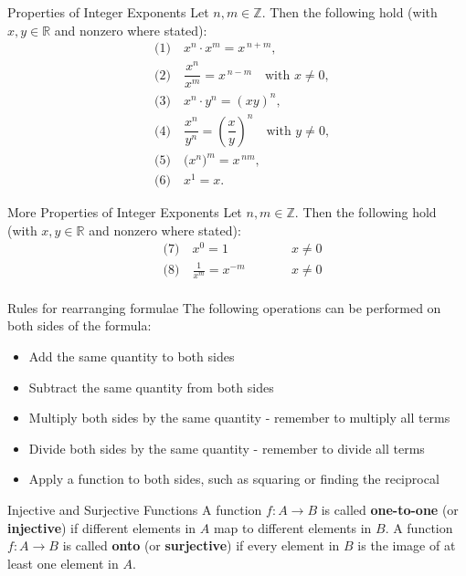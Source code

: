 \begin{proposition}{Properties of Integer Exponents}
Let $n,m\in\mathbb{Z}$. Then the following hold (with $x,y\in\mathbb{R}$ and nonzero where stated):
\[
\begin{aligned}
&\text{(1)}\quad x^{n}\cdot x^{m}=x^{\,n+m},\\[2pt]
&\text{(2)}\quad \dfrac{x^{n}}{x^{m}}=x^{\,n-m}\quad \text{with } x\neq 0,\\[2pt]
&\text{(3)}\quad x^{n}\cdot y^{n}=(xy)^{n},\\[2pt]
&\text{(4)}\quad \dfrac{x^{n}}{y^{n}}=\left(\dfrac{x}{y}\right)^{n}\quad \text{with } y\neq 0,\\[2pt]
&\text{(5)}\quad \bigl(x^{n}\bigr)^{m}=x^{\,nm},\\[2pt]
&\text{(6)}\quad x^{1}=x.
\end{aligned}
\]
\end{proposition}

\begin{proposition}{More Properties of Integer Exponents}
Let $n,m\in\mathbb{Z}$. Then the following hold (with $x,y\in\mathbb{R}$ and nonzero where stated):
\[
\begin{aligned}
&\text{(7)}\quad x^{0}=1   &\qquad&   x \neq 0  \\
&\text{(8)}\quad \frac{1}{x^{m}}=x^{-m} &\qquad& x \neq 0 \\
\end{aligned}
\]
\end{proposition}

\begin{custombox}{Rules for rearranging formulae}
The following operations can be performed on both sides of the formula:
\begin{itemize}
    \item Add the same quantity to both sides
    \item Subtract the same quantity from both sides
    \item Multiply both sides by the same quantity - remember to multiply all terms
    \item Divide both sides by the same quantity - remember to divide all terms
    \item Apply a function to both sides, such as squaring or finding the reciprocal
\end{itemize}
\end{custombox}

\begin{definition} {Injective and Surjective Functions}
A function \( f: A \rightarrow B \) is called \textbf{one-to-one} (or \textbf{injective}) if different elements in \( A \) map to different elements in \( B \). 
A function \( f: A \rightarrow B \) is called \textbf{onto} (or \textbf{surjective}) if every element in \( B \) is the image of at least one element in \( A \).
\end{definition}

